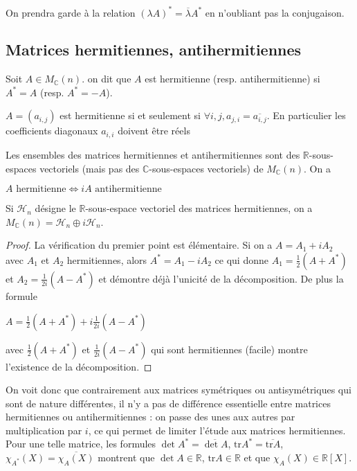 \begin{rem}
On prendra garde à la relation $(\lambda A)^* = \overline{\lambda} A^*$ en n'oubliant pas la conjugaison.
\end{rem}

\subsection{Matrices hermitiennes, antihermitiennes}

\begin{de}
Soit $A \in M_\mathbb{C}(n)$. on dit que $A$ est hermitienne (resp. antihermitienne) si $A^* = A$ (resp. $A^* = -A$).
\end{de}

\begin{rem}
$A = (a_{i,j})$ est hermitienne si et seulement si $\forall i,j, a_{j,i} = \overline{a_{i,j}}$. En particulier les coefficients diagonaux $a_{i,i}$ doivent être réels
\end{rem}

\begin{thm}
Les ensembles des matrices hermitiennes et antihermitiennes sont des $\mathbb{R}$-sous-espaces vectoriels (mais pas des $\mathbb{C}$-sous-espaces vectoriels) de $M_\mathbb{C}(n)$. On a

$A \text{ hermitienne} \Leftrightarrow iA \text{ antihermitienne}$

Si $\mathcal{H}_n$ désigne le $\mathbb{R}$-sous-espace vectoriel des matrices hermitiennes, on a $M_\mathbb{C}(n) = \mathcal{H}_n \oplus i\mathcal{H}_n$.
\end{thm}

\begin{proof}
La vérification du premier point est élémentaire. Si on a $A = A_1 + iA_2$ avec $A_1$ et $A_2$ hermitiennes, alors $A^* = A_1 - iA_2$ ce qui donne $A_1 = \frac{1}{2}(A + A^*)$ et $A_2 = \frac{1}{2i}(A - A^*)$ et démontre déjà l'unicité de la décomposition. De plus la formule

$A = \frac{1}{2}(A + A^*) + i\frac{1}{2i}(A - A^*)$

avec $\frac{1}{2}(A + A^*)$ et $\frac{1}{2i}(A - A^*)$ qui sont hermitiennes (facile) montre l'existence de la décomposition.
\end{proof}

\begin{rem}
On voit donc que contrairement aux matrices symétriques ou antisymétriques qui sont de nature différentes, il n'y a pas de différence essentielle entre matrices hermitiennes ou antihermitiennes : on passe des unes aux autres par multiplication par $i$, ce qui permet de limiter l'étude aux matrices hermitiennes. Pour une telle matrice, les formules $\det A^* = \overline{\det A}$, $\mathrm{tr} A^* = \overline{\mathrm{tr} A}$, $\chi_{A^*}(X) = \overline{\chi_A(X)}$ montrent que $\det A \in \mathbb{R}$, $\mathrm{tr} A \in \mathbb{R}$ et que $\chi_A(X) \in \mathbb{R}[X]$.
\end{rem}